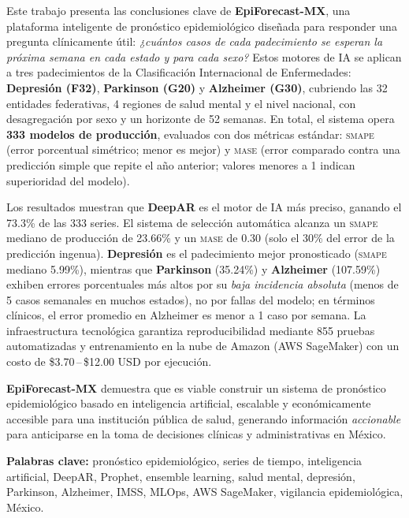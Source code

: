 \documentclass[12pt, letterpaper]{article}
\newcommand{\smape}{\textnormal{\textsc{smape}}}
\newcommand{\mase}{\textnormal{\textsc{mase}}}
\begin{document}
Este trabajo presenta las conclusiones clave de \textbf{EpiForecast-MX}, una plataforma inteligente de pronóstico epidemiológico diseñada para responder una pregunta clínicamente útil: \textit{¿cuántos casos de cada padecimiento se esperan la próxima semana en cada estado y para cada sexo?}
Estos motores de IA se aplican a tres padecimientos de la Clasificación Internacional de Enfermedades: \textbf{Depresión (F32)}, \textbf{Parkinson (G20)} y \textbf{Alzheimer (G30)}, cubriendo las 32 entidades federativas, 4 regiones de salud mental y el nivel nacional, con desagregación por sexo y un horizonte de 52 semanas. En total, el sistema opera \textbf{333 modelos de producción}, evaluados con dos métricas estándar: \smape{} (error porcentual simétrico; menor es mejor) y \mase{} (error comparado contra una predicción simple que repite el año anterior; valores menores a 1 indican superioridad del modelo).

Los resultados muestran que \textbf{DeepAR} es el motor de IA más preciso, ganando el 73.3\% de las 333 series. El sistema de selección automática alcanza un \smape{} mediano de producción de 23.66\% y un \mase{} de 0.30 (solo el 30\% del error de la predicción ingenua). \textbf{Depresión} es el padecimiento mejor pronosticado (\smape{} mediano 5.99\%), mientras que \textbf{Parkinson} (35.24\%) y \textbf{Alzheimer} (107.59\%) exhiben errores porcentuales más altos por su \emph{baja incidencia absoluta} (menos de 5 casos semanales en muchos estados), no por fallas del modelo; en términos clínicos, el error promedio en Alzheimer es menor a 1 caso por semana. La infraestructura tecnológica garantiza reproducibilidad mediante 855 pruebas automatizadas y entrenamiento en la nube de Amazon (AWS SageMaker) con un costo de \$3.70\,--\,\$12.00 USD por ejecución.

\textbf{EpiForecast-MX} demuestra que es viable construir un sistema de pronóstico epidemiológico basado en inteligencia artificial, escalable y económicamente accesible para una institución pública de salud, generando información \emph{accionable} para anticiparse en la toma de decisiones clínicas y administrativas en México.

\vspace{0.8cm}

\noindent\textbf{Palabras clave:} pronóstico epidemiológico, series de tiempo, inteligencia artificial, DeepAR, Prophet, ensemble learning, salud mental, depresión, Parkinson, Alzheimer, IMSS, MLOps, AWS SageMaker, vigilancia epidemiológica, México.
\end{document}
